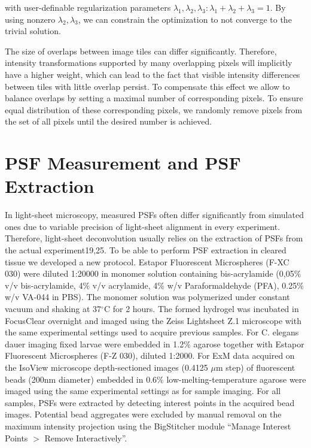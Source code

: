 with user-definable regularization parameters $\lambda_1, \lambda_2, \lambda_3: \lambda_1+ \lambda_2+\lambda_3 = 1$. By using nonzero $\lambda_2, \lambda_3$, we can constrain the optimization to not converge to the trivial solution.

The size of overlaps between image tiles can differ significantly. Therefore, intensity transformations supported by many overlapping pixels will implicitly have a higher weight, which can lead to the fact that visible intensity differences between tiles with little overlap persist. To compensate this effect we allow to balance overlaps by setting a maximal number of corresponding pixels. To ensure equal distribution of these corresponding pixels, we randomly remove pixels from the set of all pixels until the desired number is achieved.

\section{PSF Measurement and PSF Extraction}
\label{sec:psf}

In light-sheet microscopy, measured PSFs often differ significantly from simulated ones due to variable precision of light-sheet alignment in every experiment. Therefore, light-sheet deconvolution usually relies on the extraction of PSFs from the actual experiment19,25. To be able to perform PSF extraction in cleared tissue we developed a new protocol. Estapor Fluorescent Microspheres (F-XC 030) were diluted 1:20000 in monomer solution containing bis-acrylamide (0,05$\%$ v/v bis-acrylamide, 4$\%$ v/v acrylamide, 4$\%$ w/v Paraformaldehyde (PFA), 0.25$\%$ w/v VA-044 in PBS). The monomer solution was polymerized under constant vacuum and shaking at 37${}^\circ$C for 2 hours.  The formed hydrogel was incubated in FocusClear overnight and imaged using the Zeiss Lightsheet Z.1 microscope with the same experimental settings used to acquire previous samples. For C. elegans dauer imaging fixed larvae were embedded in 1.2$\%$ agarose together with Estapor Fluorescent Microspheres (F-Z 030), diluted 1:2000. For ExM data acquired on the IsoView microscope depth-sectioned images (0.4125 $\mu$m step) of fluorescent beads (200nm diameter) embedded in 0.6$\%$ low-melting-temperature agarose were imaged using the same experimental settings as for sample imaging. For all samples, PSFs were extracted by detecting interest points in the acquired bead images. Potential bead aggregates were excluded by manual removal on the maximum intensity projection using the BigStitcher module “Manage Interest Points $>$ Remove Interactively”.

